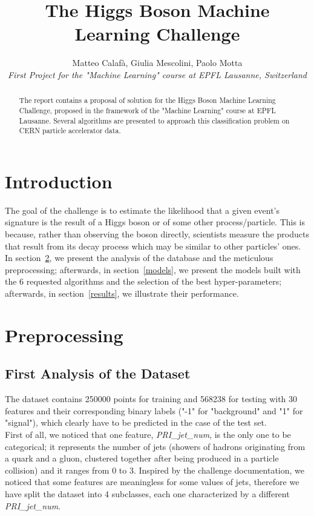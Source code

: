 \documentclass[10pt,conference,compsocconf]{IEEEtran}
\begin{document}
\title{The Higgs Boson Machine Learning Challenge}

\author{
  Matteo Calafà, Giulia Mescolini, Paolo Motta\\
  \textit{First Project for the "Machine Learning" course at EPFL Lausanne, Switzerland}
}

\maketitle

\begin{abstract}
 The report contains a proposal of solution for the Higgs Boson Machine Learning Challenge, proposed in the framework of the "Machine Learning" course at EPFL Lausanne. Several algorithms are presented to approach this classification problem on CERN particle accelerator data.
\end{abstract}

\section{Introduction}

The goal of the challenge is to estimate the likelihood that a given event's signature is the result of a Higgs boson or of some other process/particle. This is because, rather than observing the boson directly, scientists measure the products that result from its decay process which may be similar to other particles' ones. \\
In section~\ref{preprocessing}, we present the analysis of the database and the meticulous preprocessing; afterwards, in section~\ref{models}, we present the models built with the 6 requested algorithms and the selection of the best hyper-parameters; afterwards, in section~\ref{results}, we illustrate their performance.

\section{Preprocessing}
\label{preprocessing}

\subsection{First Analysis of the Dataset}
\label{categorical}
The dataset contains 250000 points for training and 568238 for testing with 30 features and their corresponding binary labels ("-1" for "background" and "1" for "signal"), which clearly have to be predicted in the case of the test set. \\
First of all, we noticed that one feature, \emph{PRI\_jet\_num}, is the only one to be categorical; it represents the number of jets (showers of hadrons originating from a quark and a gluon, clustered together after being produced in a particle collision) and it ranges from 0 to 3. Inspired by the challenge documentation, we noticed that some features are meaningless for some values of jets, therefore we have split the dataset into 4 subclasses, each one characterized by a different \emph{PRI\_jet\_num}.
\end{document}
